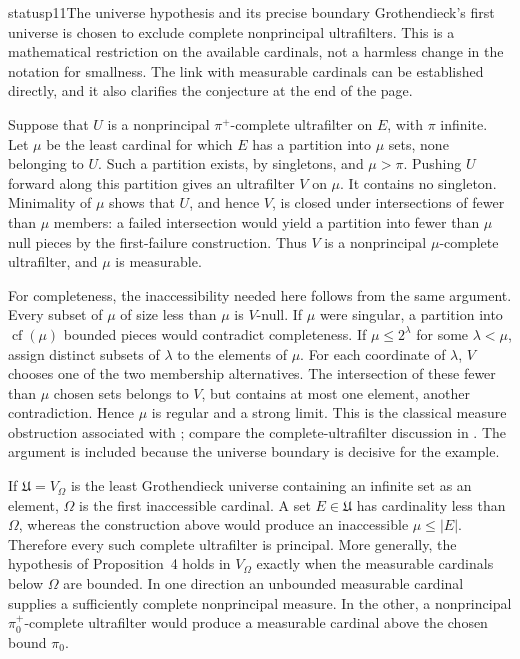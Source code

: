 \begin{dcomment}{status}{p11}{The universe hypothesis and its precise boundary}
Grothendieck's first universe is chosen to exclude complete nonprincipal ultrafilters. This is a mathematical restriction on the available cardinals, not a harmless change in the notation for smallness. The link with measurable cardinals can be established directly, and it also clarifies the conjecture at the end of the page.

Suppose that $U$ is a nonprincipal $\pi^+$-complete ultrafilter on $E$, with $\pi$ infinite. Let $\mu$ be the least cardinal for which $E$ has a partition into $\mu$ sets, none belonging to $U$. Such a partition exists, by singletons, and $\mu>\pi$. Pushing $U$ forward along this partition gives an ultrafilter $V$ on $\mu$. It contains no singleton. Minimality of $\mu$ shows that $U$, and hence $V$, is closed under intersections of fewer than $\mu$ members: a failed intersection would yield a partition into fewer than $\mu$ null pieces by the first-failure construction. Thus $V$ is a nonprincipal $\mu$-complete ultrafilter, and $\mu$ is measurable.

For completeness, the inaccessibility needed here follows from the same argument. Every subset of $\mu$ of size less than $\mu$ is $V$-null. If $\mu$ were singular, a partition into $\operatorname{cf}(\mu)$ bounded pieces would contradict completeness. If $\mu\le2^\lambda$ for some $\lambda<\mu$, assign distinct subsets of $\lambda$ to the elements of $\mu$. For each coordinate of $\lambda$, $V$ chooses one of the two membership alternatives. The intersection of these fewer than $\mu$ chosen sets belongs to $V$, but contains at most one element, another contradiction. Hence $\mu$ is regular and a strong limit. This is the classical measure obstruction associated with \citet{Ulam1930Measure}; compare the complete-ultrafilter discussion in \citet[Section~5]{Keisler2010Ultraproduct}. The argument is included because the universe boundary is decisive for the example.

If $\mathfrak U=V_\Omega$ is the least Grothendieck universe containing an infinite set as an element, $\Omega$ is the first inaccessible cardinal. A set $E\in\mathfrak U$ has cardinality less than $\Omega$, whereas the construction above would produce an inaccessible $\mu\le|E|$. Therefore every such complete ultrafilter is principal. More generally, the hypothesis of Proposition~4 holds in $V_\Omega$ exactly when the measurable cardinals below $\Omega$ are bounded. In one direction an unbounded measurable cardinal supplies a sufficiently complete nonprincipal measure. In the other, a nonprincipal $\pi_0^+$-complete ultrafilter would produce a measurable cardinal above the chosen bound $\pi_0$.


\end{dcomment}
